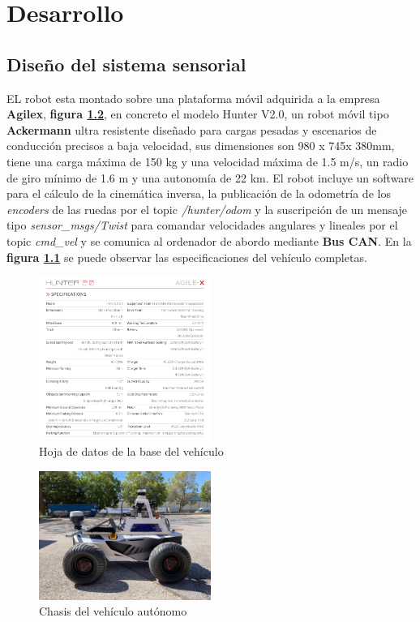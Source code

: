 \chapter{Desarrollo}

\section{Diseño del sistema sensorial}

EL robot esta montado sobre una plataforma móvil adquirida a la empresa \textbf{Agilex}, \textbf{figura \ref{fig:hunter}}, en concreto el 
modelo Hunter V2.0, un robot móvil tipo \textbf{Ackermann} ultra resistente diseñado para cargas pesadas y escenarios de conducción precisos 
a baja velocidad, sus dimensiones son 980 x 745x 380mm, tiene una carga máxima de 150 kg y una velocidad máxima de 1.5 m/s, un radio 
de giro mínimo de 1.6 m y una autonomía de 22 km. El robot incluye un software para el cálculo de la cinemática inversa, la publicación de 
la odometría de los \textit{encoders} de las ruedas por el topic \textit{/hunter/odom} y la suscripción de un mensaje tipo \textit{sensor\_msgs/Twist} 
para comandar velocidades angulares y lineales por el topic \textit{cmd\_vel} y se comunica al ordenador de abordo mediante \textbf{Bus CAN}. 
En la \textbf{figura \ref{fig:datasheet_hunter}} se puede observar las especificaciones del vehículo completas.


\begin{figure}[h]
    \centering
    \includegraphics[width=0.5\textwidth]{images/hunter_datasheet.png}
    \caption{Hoja de datos de la base del vehículo}
    \label{fig:datasheet_hunter}
\end{figure}

\begin{figure}[h]
    \centering
    \includegraphics[width=0.5\textwidth]{images/hunter_v2.jpeg}
    \caption{Chasis del vehículo autónomo}
    \label{fig:hunter}
\end{figure}

